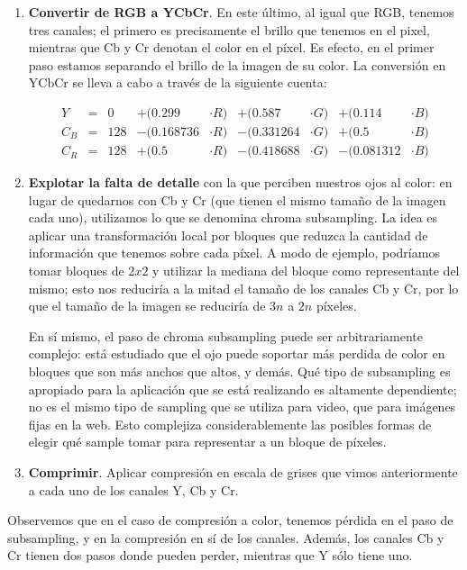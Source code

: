 \documentclass{article}
\begin{document}
\begin{enumerate}
\item
	{\bf Convertir de RGB a YCbCr}.
	En este último, al igual que RGB, tenemos tres canales; el primero es precisamente el brillo que tenemos en el pixel, mientras que Cb y Cr denotan el color en el píxel. Es efecto, en el primer paso estamos separando el brillo de la imagen de su color. La conversión en YCbCr se lleva a cabo a través de la siguiente cuenta:

	\begin{align}
		Y &=&  0 &+ (0.299  & \cdot R) &+ (0.587  & \cdot G) &+ (0.114  & \cdot B)\\
		C_B &=& 128 & - (0.168736 & \cdot R) &- (0.331264 & \cdot G) &+ (0.5   & \cdot B)\\
		C_R &=& 128 &+ (0.5   & \cdot R) &- (0.418688 & \cdot G) &- (0.081312 & \cdot B)
	\end{align}

\item
	{\bf Explotar la falta de detalle} con la que perciben nuestros ojos al color: en lugar de quedarnos con Cb y Cr (que tienen el mismo tamaño de la imagen cada uno), utilizamos lo que se denomina chroma subsampling. La idea es aplicar una transformación local por bloques que reduzca la cantidad de información que tenemos sobre cada píxel. A modo de ejemplo, podríamos tomar bloques de $2x2$ y utilizar la mediana del bloque como representante del mismo; esto nos reduciría a la mitad el tamaño de los canales Cb y Cr, por lo que el tamaño de la imagen se reduciría de $3n$ a $2n$ píxeles.

	En sí mismo, el paso de chroma subsampling puede ser arbitrariamente complejo: está estudiado que el ojo puede soportar más perdida de color en bloques que son más anchos que altos, y demás. Qué tipo de subsampling es apropiado para la aplicación que se está realizando es altamente dependiente; no es el mismo tipo de sampling que se utiliza para video, que para imágenes fijas en la web. Esto complejiza considerablemente las posibles formas de elegir qué sample tomar para representar a un bloque de píxeles.

\item
	{\bf Comprimir}.
	Aplicar compresión en escala de grises que vimos anteriormente a cada uno de los canales Y, Cb y Cr.
\end{enumerate}

Observemos que en el caso de compresión a color, tenemos pérdida en el paso de subsampling, y en la compresión en sí de los canales. Además, los canales Cb y Cr tienen dos pasos donde pueden perder, mientras que Y sólo tiene uno.
\end{document}
